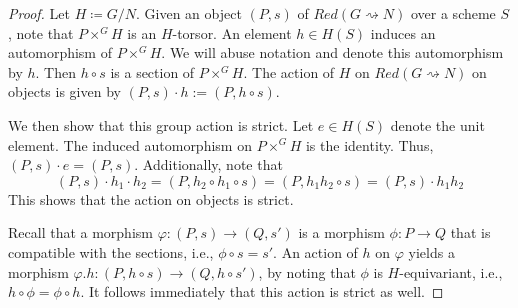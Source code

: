 \documentclass[12pt, final]{amsart}
\theoremstyle{remark}
\theoremstyle{definition}
\theoremstyle{plain}
\newcommand{\rsa}{\rightsquigarrow}
\begin{document}
\begin{proof}
    Let $H \coloneqq G/N$. Given an object $(P,s)$ of 
    $Red(G\rsa N)$ over a scheme $S$, note that $P \times^G H$ is an $H$-torsor. 
    An element $h \in H(S)$ induces an automorphism of $P \times^G H$.
    We will abuse notation and denote this automorphism by $h$. Then $h\circ s$
    is a section of $P \times^G H$. The action of $H$ on $Red(G\rsa N)$ on 
    objects is given by $(P,s)\cdot h := (P,h\circ s)$.

    We then show that this group action is strict. 
    Let $e \in H(S)$ denote the unit element. The induced automorphism on $P \times^G H$ is the identity. Thus, 
    $(P,s)\cdot e = (P,s)$. Additionally, note that 
   $$
   (P,s)\cdot h_1\cdot h_2 = (P,h_2\circ h_1 \circ s) = (P,h_1h_2\circ s) = (P,s)\cdot h_1h_2
   $$  This shows that the action on objects is strict.
    
    
    
  
Recall that a morphism $\varphi \colon (P,s) \to (Q, s')$ is a morphism $\phi \colon P\to Q$ that is compatible with the sections, i.e., $\phi \circ s = s'$. An action of $h$ on $\varphi$ yields a morphism $\varphi.h \colon (P, h\circ s) \to (Q, h\circ s')$, by noting that $\phi$ is $H$-equivariant, i.e., $h \circ \phi = \phi \circ h$. It follows immediately that this action is strict as well.  
\end{proof}
\end{document}
